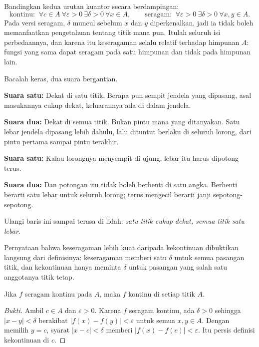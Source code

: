 Bandingkan kedua urutan kuantor secara berdampingan:
\[
\text{kontinu: }\ \forall c\in A\ \forall\varepsilon>0\ \exists\delta>0\
\forall x\in A,
\qquad
\text{seragam: }\ \forall\varepsilon>0\ \exists\delta>0\ \forall x,y\in A .
\]
Pada versi seragam, $\delta$ muncul sebelum $x$ dan $y$ diperkenalkan, jadi ia tidak
boleh memanfaatkan pengetahuan tentang titik mana pun. Itulah seluruh isi
perbedaannya, dan karena itu keseragaman selalu relatif terhadap himpunan $A$: fungsi
yang sama dapat seragam pada satu himpunan dan tidak pada himpunan lain.

\begin{bacakeras}
Bacalah keras, dua suara bergantian.

\textbf{Suara satu:} Dekat di satu titik. Berapa pun sempit jendela yang dipasang,
asal masukannya cukup dekat, keluarannya ada di dalam jendela.

\textbf{Suara dua:} Dekat di semua titik. Bukan pintu mana yang ditanyakan. Satu lebar
jendela dipasang lebih dahulu, lalu dituntut berlaku di seluruh lorong, dari pintu
pertama sampai pintu terakhir.

\textbf{Suara satu:} Kalau lorongnya menyempit di ujung, lebar itu harus dipotong
terus.

\textbf{Suara dua:} Dan potongan itu tidak boleh berhenti di satu angka. Berhenti
berarti satu lebar untuk seluruh lorong; terus mengecil berarti janji sepotong-sepotong.

Ulangi baris ini sampai terasa di lidah: \emph{satu titik cukup dekat, semua titik satu
lebar.}
\end{bacakeras}

Pernyataan bahwa keseragaman lebih kuat daripada kekontinuan dibuktikan langsung dari
definisinya: keseragaman memberi satu $\delta$ untuk semua pasangan titik, dan
kekontinuan hanya meminta $\delta$ untuk pasangan yang salah satu anggotanya titik
tetap.

\begin{proposisi}
Jika $f$ seragam kontinu pada $A$, maka $f$ kontinu di setiap titik $A$.
\end{proposisi}

\begin{proof}[Bukti]
Ambil $c\in A$ dan $\varepsilon>0$. Karena $f$ seragam kontinu, ada $\delta>0$
sehingga $|x-y|<\delta$ berakibat $|f(x)-f(y)|<\varepsilon$ untuk semua $x,y\in A$.
Dengan memilih $y=c$, syarat $|x-c|<\delta$ memberi $|f(x)-f(c)|<\varepsilon$. Itu
persis definisi kekontinuan di $c$.
\end{proof}

